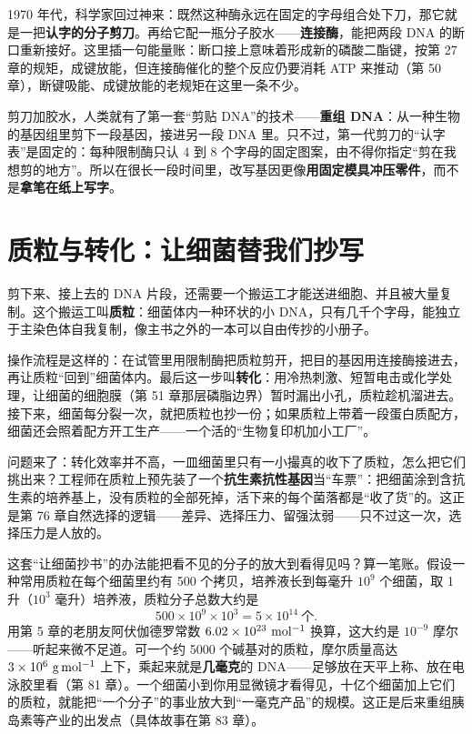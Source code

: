 1970 年代，科学家回过神来：既然这种酶永远在固定的字母组合处下刀，那它就是一把\textbf{认字的分子剪刀}。再给它配一瓶分子胶水——\textbf{连接酶}，能把两段 DNA 的断口重新接好。这里插一句能量账：断口接上意味着形成新的磷酸二酯键，按第 27 章的规矩，成键放能，但连接酶催化的整个反应仍要消耗 ATP 来推动（第 50 章），断键吸能、成键放能的老规矩在这里一条不少。

剪刀加胶水，人类就有了第一套“剪贴 DNA”的技术——\textbf{重组 DNA}：从一种生物的基因组里剪下一段基因，接进另一段 DNA 里。只不过，第一代剪刀的“认字表”是固定的：每种限制酶只认 4 到 8 个字母的固定图案，由不得你指定“剪在我想剪的地方”。所以在很长一段时间里，改写基因更像\textbf{用固定模具冲压零件}，而不是\textbf{拿笔在纸上写字}。

\section{质粒与转化：让细菌替我们抄写}

剪下来、接上去的 DNA 片段，还需要一个搬运工才能送进细胞、并且被大量复制。这个搬运工叫\textbf{质粒}：细菌体内一种环状的小 DNA，只有几千个字母，能独立于主染色体自我复制，像主书之外的一本可以自由传抄的小册子。

操作流程是这样的：在试管里用限制酶把质粒剪开，把目的基因用连接酶接进去，再让质粒“回到”细菌体内。最后这一步叫\textbf{转化}：用冷热刺激、短暂电击或化学处理，让细菌的细胞膜（第 51 章那层磷脂边界）暂时漏出小孔，质粒趁机溜进去。接下来，细菌每分裂一次，就把质粒也抄一份；如果质粒上带着一段蛋白质配方，细菌还会照着配方开工生产——一个活的“生物复印机加小工厂”。

问题来了：转化效率并不高，一皿细菌里只有一小撮真的收下了质粒，怎么把它们挑出来？工程师在质粒上预先装了一个\textbf{抗生素抗性基因}当“车票”：把细菌涂到含抗生素的培养基上，没有质粒的全部死掉，活下来的每个菌落都是“收了货”的。这正是第 76 章自然选择的逻辑——差异、选择压力、留强汰弱——只不过这一次，选择压力是人放的。

\begin{qiaoliang}
这套“让细菌抄书”的办法能把看不见的分子的放大到看得见吗？算一笔账。假设一种常用质粒在每个细菌里约有 500 个拷贝，培养液长到每毫升 $10^{9}$ 个细菌，取 1 升（$10^{3}$ 毫升）培养液，质粒分子总数大约是
\[500 \times 10^{9} \times 10^{3} = 5\times 10^{14}\ \text{个}.\]
用第 5 章的老朋友阿伏伽德罗常数 $6.02\times 10^{23}\ \mathrm{mol^{-1}}$ 换算，这大约是 $10^{-9}$ 摩尔——听起来微不足道。可一个约 5000 个碱基对的质粒，摩尔质量高达 $3\times 10^{6}\ \mathrm{g\,mol^{-1}}$ 上下，乘起来就是\textbf{几毫克}的 DNA——足够放在天平上称、放在电泳胶里看（第 81 章）。一个细菌小到你用显微镜才看得见，十亿个细菌加上它们的质粒，就能把“一个分子”的事业放大到“一毫克产品”的规模。这正是后来重组胰岛素等产业的出发点（具体故事在第 83 章）。
\end{qiaoliang}

